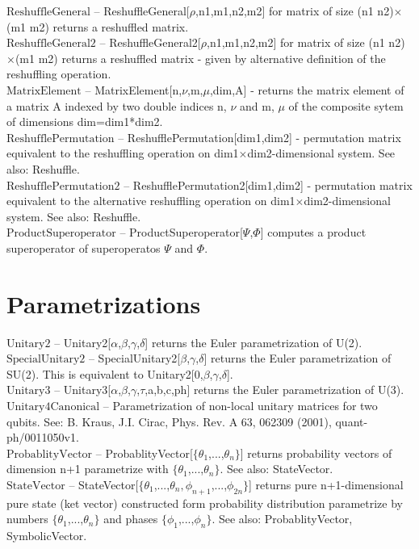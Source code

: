 \documentclass[a4paper,10pt]{scrartcl}
\begin{document}
\noindent\textbf{$ \text{ReshuffleGeneral} $ }-- ReshuffleGeneral[$\rho $,n1,m1,n2,m2] for matrix of size (n1 n2)$\times $(m1 m2) returns a reshuffled matrix.$  $\\[8pt]
\noindent\textbf{$ \text{ReshuffleGeneral2} $ }-- ReshuffleGeneral2[$\rho $,n1,m1,n2,m2] for matrix of size (n1 n2)$\times $(m1 m2) returns a reshuffled matrix - given by alternative definition of the reshuffling operation.$  $\\[8pt]
\noindent\textbf{$ \text{MatrixElement} $ }-- MatrixElement[n,$\nu $,m,$\mu $,dim,A] - returns the matrix element of a matrix A indexed by two double indices n, $\nu $ and m, $\mu $ of the composite sytem of dimensions dim=dim1*dim2.$  $\\[8pt]
\noindent\textbf{$ \text{ReshufflePermutation} $ }-- ReshufflePermutation[dim1,dim2] - permutation matrix equivalent to the reshuffling operation on dim1$\times $dim2-dimensional system. See also: Reshuffle.$  $\\[8pt]
\noindent\textbf{$ \text{ReshufflePermutation2} $ }-- ReshufflePermutation2[dim1,dim2] - permutation matrix equivalent to the alternative reshuffling operation on dim1$\times $dim2-dimensional system. See also: Reshuffle.$  $\\[8pt]
\noindent\textbf{$ \text{ProductSuperoperator} $ }-- ProductSuperoperator[$\Psi $,$\Phi $] computes a product superoperator of superoperatos $\Psi $ and $\Phi $.$  $\\[8pt]
\section{Parametrizations}

\noindent\textbf{$ \text{Unitary2} $ }-- Unitary2[$\alpha $,$\beta $,$\gamma $,$\delta $] returns the Euler parametrization of U(2).$  $\\[8pt]
\noindent\textbf{$ \text{SpecialUnitary2} $ }-- SpecialUnitary2[$\beta $,$\gamma $,$\delta $] returns the Euler parametrization of SU(2). This is equivalent to Unitary2[0,$\beta $,$\gamma $,$\delta $].$  $\\[8pt]
\noindent\textbf{$ \text{Unitary3} $ }-- Unitary3[$\alpha $,$\beta $,$\gamma $,$\tau $,a,b,c,ph] returns the Euler parametrization of U(3).$  $\\[8pt]
\noindent\textbf{$ \text{Unitary4Canonical} $ }-- Parametrization of non-local unitary matrices for two qubits. See: B. Kraus, J.I. Cirac, Phys. Rev. A 63, 062309 (2001), quant-ph/0011050v1.$  $\\[8pt]
\noindent\textbf{$ \text{ProbablityVector} $ }-- ProbablityVector[$\{$$ \theta _1 $,...,$ \theta _n $$\}$] returns probability vectors of dimension n+1 parametrize with $\{$$ \theta _1 $,...,$ \theta _n $$\}$. See also: StateVector.$  $\\[8pt]
\noindent\textbf{$ \text{StateVector} $ }-- StateVector[$\{$$ \theta _1 $,...,$ \theta _n,\phi _{n+1} $,...,$ \phi _{2 n} $$\}$] returns pure n+1-dimensional pure state (ket vector) constructed form probability distribution parametrize by numbers $\{$$ \theta _1 $,...,$ \theta _n $$\}$ and phases $\{$$ \phi _1 $,...,$ \phi _n $$\}$. See also: ProbablityVector, SymbolicVector.$  $\\[8pt]
\end{document}
